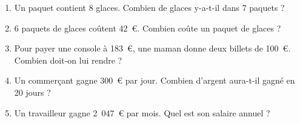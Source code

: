 
\begin{enumerate}[itemsep=2em]
 	\item Un paquet contient 8 glaces. Combien de glaces y-a-t-il dans 7 paquets ?
 	\item 6 paquets de glaces coûtent 42~€. Combien coûte un paquet de glaces ?
 	\item Pour payer une console à 183~€, une maman donne deux billets de 100~€. Combien doit-on lui rendre ?
 	\item Un commerçant gagne 300~€ par jour. Combien d'argent aura-t-il gagné en 20 jours ?
 	\item Un travailleur gagne 2~047~€ par mois. Quel est son salaire annuel ?
\end{enumerate}	